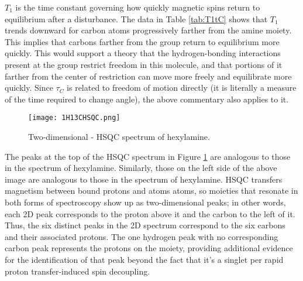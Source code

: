 \documentclass[../labs.tex]{subfiles}
\begin{document}
$T_1$ is the time constant governing how quickly magnetic spins return to equilibrium after a disturbance. The data in Table \ref{tab:T1tC} shows that $T_1$ trends downward for carbon atoms progressively farther from the amine moiety. This implies that carbons farther from the  group return to equilibrium more quickly. This would support a theory that the hydrogen-bonding interactions present at the  group restrict freedom in this molecule, and that portions of it farther from the center of restriction can move more freely and equilibrate more quickly. Since $\tau_C$ is related to freedom of motion directly (it is literally a measure of the time required to change angle), the above commentary also applies to it.

\begin{figure}[h!]
    \centering
    \texttt{[image: 1H13CHSQC.png]}
    \caption{Two-dimensional - HSQC spectrum of hexylamine.}
    \label{fig:1H13CHSQC}
\end{figure}
The peaks at the top of the HSQC spectrum in Figure \ref{fig:1H13CHSQC} are analogous to those in the  spectrum of hexylamine. Similarly, those on the left side of the above image are analogous to those in the  spectrum of hexylamine. HSQC transfers magnetism between bound protons and  atoms atoms, so moieties that resonate in both forms of spectroscopy show up as two-dimensional peaks; in other words, each 2D peak corresponds to the proton above it and the carbon to the left of it. Thus, the six distinct peaks in the 2D spectrum correspond to the six carbons and their associated protons. The one hydrogen peak with no corresponding carbon peak represents the protons on the  moiety, providing additional evidence for the identification of that peak beyond the fact that it's a singlet per rapid proton transfer-induced spin decoupling.
\newpage


\printbibliography
\setcounter{figure}{0}
\setcounter{table}{0}
\end{document}

